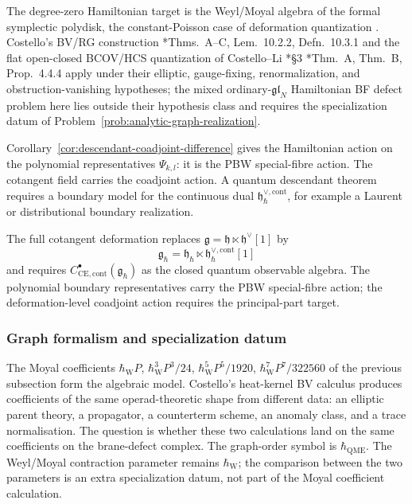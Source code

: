 \documentclass[11pt]{memoir}
\begin{document}
\begin{rmk}
  The degree-zero Hamiltonian target is the Weyl/Moyal algebra of the
  formal symplectic polydisk, the constant-Poisson case of deformation
quantization \cite{kontsevich-dq}.  Costello's BV/RG construction
\cite{costello-renormalization}*{Thms.~A--C, Lem.~10.2.2, Defn.~10.3.1}
and the flat open-closed BCOV/HCS
  quantization of Costello--Li
  \cite{costello-li-quantum-bcov}*{\S3}
  \cite{costello-li-open-closed-bcov}*{Thm.~A, Thm.~B, Prop.~4.4.4} apply
  under their elliptic, gauge-fixing, renormalization, and
  obstruction-vanishing hypotheses; the mixed
  ordinary-\(\mathfrak{gl}_N\) Hamiltonian BF defect problem here lies
  outside their hypothesis class and requires the specialization datum
  of Problem~\ref{prob:analytic-graph-realization}.
\end{rmk}

\begin{rmk}
  Corollary~\ref{cor:descendant-coadjoint-difference} gives the
  Hamiltonian action on the polynomial representatives
  \(\Psi_{k,l}\): it is the PBW special-fibre action.  The cotangent field
  carries the coadjoint action.  A quantum descendant theorem requires a
  boundary model for the continuous dual
  $\mathfrak h_{\hbar}^{\vee,\mathrm{cont}}$, for example a Laurent or
  distributional boundary realization.
\end{rmk}

\begin{rmk}
  The full cotangent deformation replaces
  $\mathfrak g=\mathfrak h\ltimes\mathfrak h^\vee[1]$ by
  $$\mathfrak g_\hbar=\mathfrak h_\hbar\ltimes
    \mathfrak h_{\hbar}^{\vee,\mathrm{cont}}[1]$$
  and requires
  $C^\bullet_{\mathrm{CE},\mathrm{cont}}(\mathfrak g_\hbar)$ as the closed
  quantum observable algebra.  The polynomial boundary representatives
  carry the PBW special-fibre action; the deformation-level coadjoint
  action requires the principal-part target.
\end{rmk}

\subsubsection{Graph formalism and specialization datum}

The Moyal coefficients \(\hbar_{\mathrm{W}} P\), \(\hbar_{\mathrm{W}}^3 P^3/24\), \(\hbar_{\mathrm{W}}^5 P^5/1920\),
\(\hbar_{\mathrm{W}}^7 P^7/322560\) of the previous subsection form the algebraic
model.  Costello's heat-kernel BV calculus produces coefficients of
the same operad-theoretic shape from different data: an elliptic
parent theory, a propagator, a counterterm scheme, an anomaly class,
and a trace normalisation.  The question is whether these two
calculations land on the same coefficients on the brane-defect
complex.
The graph-order symbol is \(\hbar_{\mathrm{QME}}\). The Weyl/Moyal
contraction parameter remains \(\hbar_{\mathrm{W}}\); the comparison
between the two parameters is an extra specialization datum, not part of
the Moyal coefficient calculation.
\end{document}

